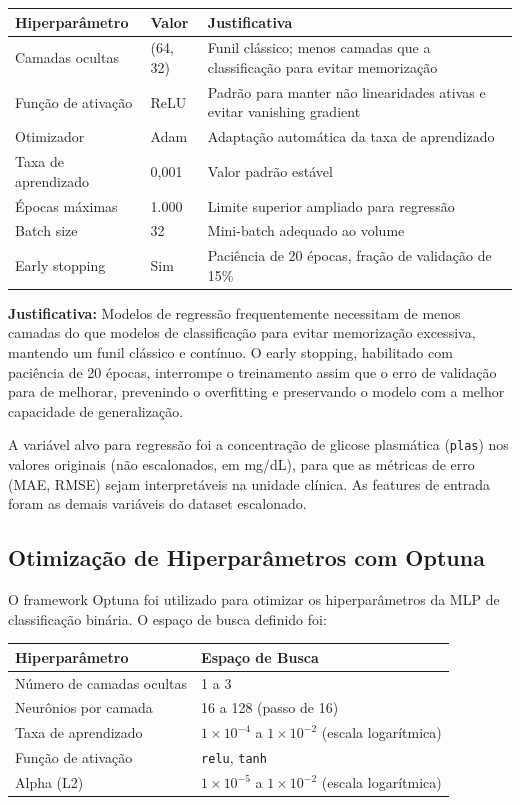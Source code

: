 \documentclass[12pt]{article}
\begin{document}
\begin{table}[ht]
\centering
\begin{tabularx}{\textwidth}{|l|l|X|}
\hline
Hiperparâmetro & Valor & Justificativa \\
\hline
Camadas ocultas & (64, 32) & Funil clássico; menos camadas que a classificação para evitar memorização \\
\hline
Função de ativação & ReLU & Padrão para manter não linearidades ativas e evitar vanishing gradient \\
\hline
Otimizador & Adam & Adaptação automática da taxa de aprendizado \\
\hline
Taxa de aprendizado & 0,001 & Valor padrão estável \\
\hline
Épocas máximas & 1.000 & Limite superior ampliado para regressão \\
\hline
Batch size & 32 & Mini-batch adequado ao volume \\
\hline
Early stopping & Sim & Paciência de 20 épocas, fração de validação de 15\% \\
\hline
\end{tabularx}
\end{table}


\textbf{Justificativa:} Modelos de regressão frequentemente necessitam de menos camadas do que modelos de classificação para evitar memorização excessiva, mantendo um funil clássico e contínuo. O early stopping, habilitado com paciência de 20 épocas, interrompe o treinamento assim que o erro de validação para de melhorar, prevenindo o overfitting e preservando o modelo com a melhor capacidade de generalização.

A variável alvo para regressão foi a concentração de glicose plasmática (\texttt{plas}) nos valores originais (não escalonados, em mg/dL), para que as métricas de erro (MAE, RMSE) sejam interpretáveis na unidade clínica. As features de entrada foram as demais variáveis do dataset escalonado.

\subsection{Otimização de Hiperparâmetros com Optuna}

O framework Optuna foi utilizado para otimizar os hiperparâmetros da MLP de classificação binária. O espaço de busca definido foi:

\begin{table}[ht]
\centering
\begin{tabularx}{\textwidth}{|l|X|}
\hline
Hiperparâmetro & Espaço de Busca \\
\hline
Número de camadas ocultas & 1 a 3 \\
\hline
Neurônios por camada & 16 a 128 (passo de 16) \\
\hline
Taxa de aprendizado & $1 \times 10^{-4}$ a $1 \times 10^{-2}$ (escala logarítmica) \\
\hline
Função de ativação & \texttt{relu}, \texttt{tanh} \\
\hline
Alpha (L2) & $1 \times 10^{-5}$ a $1 \times 10^{-2}$ (escala logarítmica) \\
\hline
\end{tabularx}
\end{table}
\end{document}
